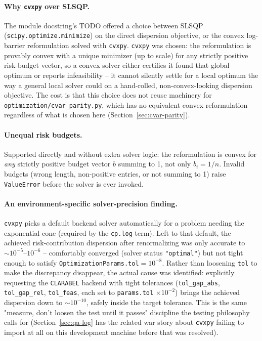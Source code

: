 \documentclass[11pt]{article}
\begin{document}
\paragraph{Why \texttt{cvxpy} over SLSQP.} The module docstring's TODO
offered a choice between SLSQP (\texttt{scipy.optimize.minimize}) on the
direct dispersion objective, or the convex log-barrier reformulation
solved with \texttt{cvxpy}. \texttt{cvxpy} was chosen: the reformulation
is provably convex with a unique minimizer (up to scale) for any strictly
positive risk-budget vector, so a convex solver either certifies it found
that global optimum or reports infeasibility -- it cannot silently settle
for a local optimum the way a general local solver could on a
hand-rolled, non-convex-looking dispersion objective. The cost is that
this choice does not reuse machinery for
\texttt{optimization/cvar\_parity.py}, which has no equivalent convex
reformulation regardless of what is chosen here (Section~\ref{sec:cvar-parity}).

\paragraph{Unequal risk budgets.} Supported directly and without extra
solver logic: the reformulation is convex for \emph{any} strictly
positive budget vector $b$ summing to 1, not only $b_i = 1/n$. Invalid
budgets (wrong length, non-positive entries, or not summing to 1) raise
\texttt{ValueError} before the solver is ever invoked.

\paragraph{An environment-specific solver-precision finding.} \texttt{cvxpy}
picks a default backend solver automatically for a problem needing the
exponential cone (required by the \texttt{cp.log} term). Left to that
default, the achieved risk-contribution dispersion after renormalizing
was only accurate to $\sim 10^{-5}$--$10^{-6}$ -- comfortably converged
(solver status \texttt{"optimal"}) but not tight enough to satisfy
\texttt{OptimizationParams.tol}$=10^{-8}$. Rather than loosening
\texttt{tol} to make the discrepancy disappear, the actual cause was
identified: explicitly requesting the \texttt{CLARABEL} backend with
tight tolerances (\texttt{tol\_gap\_abs}, \texttt{tol\_gap\_rel},
\texttt{tol\_feas}, each set to \texttt{params.tol} $\times 10^{-2}$)
brings the achieved dispersion down to $\sim 10^{-10}$, safely inside the
target tolerance. This is the same "measure, don't loosen the test until
it passes" discipline the testing philosophy calls for
(Section~\ref{sec:qa-log} has the related war story about
\texttt{cvxpy} failing to import at all on this development machine
before that was resolved).
\end{document}
